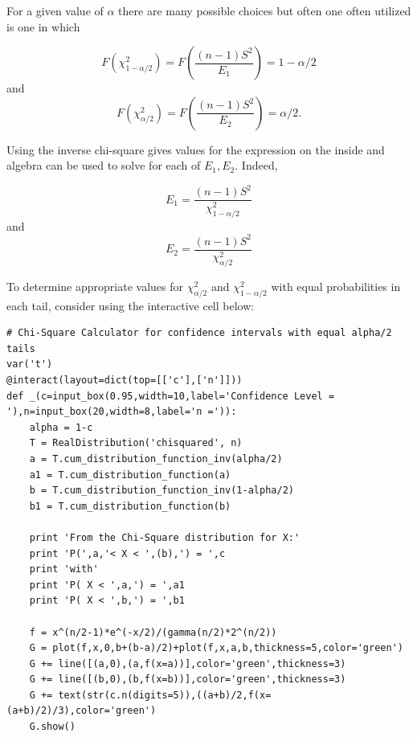 \documentclass[10pt,]{book}
\theoremstyle{plain}
\theoremstyle{definition}
\theoremstyle{definition}
\theoremstyle{definition}
\numberwithin{equation}{section}
\begin{document}
For a given value of \(\alpha\) there are many possible choices but often one often utilized is one in which 

\begin{equation*} F(\chi^2_{1-\alpha/2} ) = F \left ( \frac{(n-1)S^2}{E_1} \right ) = 1 - \alpha / 2\end{equation*}
and
\begin{equation*} F(\chi^2_{\alpha/2} ) = F \left ( \frac{(n-1)S^2}{E_2} \right ) = \alpha / 2.\end{equation*} 

Using the inverse chi-square gives values for the expression on the inside and algebra can be used to solve for each of \(E_1, E_2\). Indeed,

\begin{equation*} E_1 = \frac{(n-1)S^2}{\chi^2_{1-\alpha/2}} \end{equation*}
and
\begin{equation*} E_2 = \frac{(n-1)S^2}{\chi^2_{\alpha/2}} \end{equation*}

%
\par

To determine appropriate values for \(\chi^2_{\alpha/2} \) and \(\chi^2_{1-\alpha/2} \) with equal probabilities in each tail, consider using the interactive cell below:
%
\begin{lstlisting}[style=sageinput]
# Chi-Square Calculator for confidence intervals with equal alpha/2 tails
var('t')
@interact(layout=dict(top=[['c'],['n']]))
def _(c=input_box(0.95,width=10,label='Confidence Level = '),n=input_box(20,width=8,label='n =')):
    alpha = 1-c
    T = RealDistribution('chisquared', n)
    a = T.cum_distribution_function_inv(alpha/2)
    a1 = T.cum_distribution_function(a)
    b = T.cum_distribution_function_inv(1-alpha/2)
    b1 = T.cum_distribution_function(b)
    
    print 'From the Chi-Square distribution for X:'
    print 'P(',a,'< X < ',(b),') = ',c
    print 'with'
    print 'P( X < ',a,') = ',a1
    print 'P( X < ',b,') = ',b1
    
    f = x^(n/2-1)*e^(-x/2)/(gamma(n/2)*2^(n/2))
    G = plot(f,x,0,b+(b-a)/2)+plot(f,x,a,b,thickness=5,color='green')
    G += line([(a,0),(a,f(x=a))],color='green',thickness=3)
    G += line([(b,0),(b,f(x=b))],color='green',thickness=3)
    G += text(str(c.n(digits=5)),((a+b)/2,f(x=(a+b)/2)/3),color='green')
    G.show()
\end{lstlisting}
\par
\end{document}
